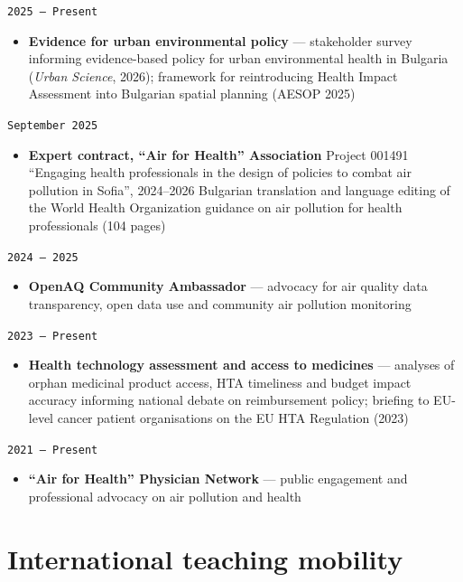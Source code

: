 \documentclass[
  10.5pt,
  a4paper,
  DIV=11,
  numbers=noendperiod]{scrartcl}
\providecommand{\tightlist}{%
  \setlength{\itemsep}{0pt}\setlength{\parskip}{0pt}}
\let\oldtexttt\texttt
\renewcommand{\texttt}[1]{{\color{cvbronze}\small\oldtexttt{#1}}}
\begin{document}
\texttt{2025\ –\ Present}

\begin{itemize}
\tightlist
\item
  \textbf{Evidence for urban environmental policy} --- stakeholder
  survey informing evidence-based policy for urban environmental health
  in Bulgaria (\emph{Urban Science}, 2026); framework for reintroducing
  Health Impact Assessment into Bulgarian spatial planning (AESOP 2025)
\end{itemize}

\texttt{September\ 2025}

\begin{itemize}
\tightlist
\item
  \textbf{Expert contract, ``Air for Health'' Association} \textbar{}
  Project 001491 ``Engaging health professionals in the design of
  policies to combat air pollution in Sofia'', 2024--2026 \textbar{}
  Bulgarian translation and language editing of the World Health
  Organization guidance on air pollution for health professionals (104
  pages)
\end{itemize}

\texttt{2024\ –\ 2025}

\begin{itemize}
\tightlist
\item
  \textbf{OpenAQ Community Ambassador} --- advocacy for air quality data
  transparency, open data use and community air pollution monitoring
\end{itemize}

\texttt{2023\ –\ Present}

\begin{itemize}
\tightlist
\item
  \textbf{Health technology assessment and access to medicines} ---
  analyses of orphan medicinal product access, HTA timeliness and budget
  impact accuracy informing national debate on reimbursement policy;
  briefing to EU-level cancer patient organisations on the EU HTA
  Regulation (2023)
\end{itemize}

\texttt{2021\ –\ Present}

\begin{itemize}
\tightlist
\item
  \textbf{``Air for Health'' Physician Network} --- public engagement
  and professional advocacy on air pollution and health
\end{itemize}

\section{International teaching
mobility}\label{international-teaching-mobility}
\end{document}
